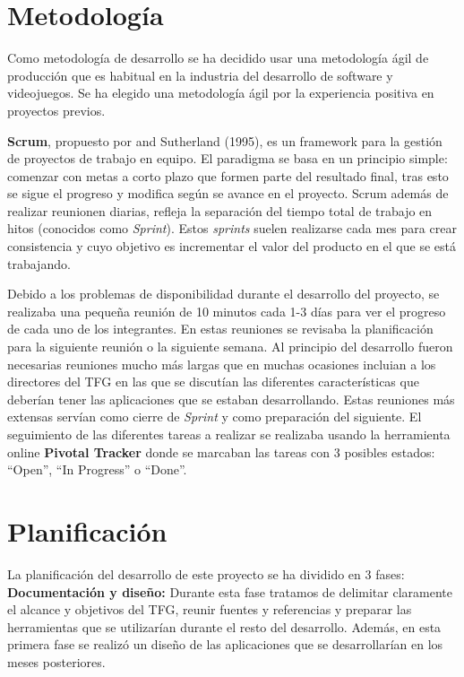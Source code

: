 \section{Metodolog\'ia}

Como metodolog\'ia de desarrollo se ha decidido usar una metodolog\'ia \'agil de producci\'on que es habitual en la industria del desarrollo de software y videojuegos. Se ha elegido una metodolog\'ia \'agil por la experiencia positiva en proyectos previos.

\textbf{Scrum}, propuesto por \cite{scrum} and Sutherland (1995), es un framework para la gesti\'on de proyectos de trabajo en equipo. El paradigma se basa en un principio simple: comenzar con metas a corto plazo que formen parte del resultado final, tras esto se sigue el progreso y modifica seg\'un se avance en el proyecto. Scrum adem\'as de realizar reunionen diarias, refleja la separaci\'on del tiempo total de trabajo en hitos (conocidos como \textit{Sprint}). Estos \textit{sprints} suelen realizarse cada mes para crear consistencia y cuyo objetivo es incrementar el valor del producto en el que se est\'a trabajando.

Debido a los problemas de disponibilidad durante el desarrollo del proyecto, se realizaba una peque\~na reuni\'on de 10 minutos cada 1-3 d\'ias para ver el progreso de cada uno de los integrantes. En estas reuniones se revisaba la planificaci\'on para la siguiente reuni\'on o la siguiente semana. Al principio del desarrollo fueron necesarias reuniones mucho m\'as largas que en muchas ocasiones incluian a los directores del TFG en las que se discut\'ian las diferentes caracter\'isticas que deber\'ian tener las aplicaciones que se estaban desarrollando. Estas reuniones m\'as extensas serv\'ian como cierre de \textit{Sprint} y como preparaci\'on del siguiente. El seguimiento de las diferentes tareas a realizar se realizaba usando la herramienta online \textbf{Pivotal Tracker} donde se marcaban las tareas con 3 posibles estados: ``Open'', ``In Progress'' o ``Done''.


\section{Planificaci\'on}

La planificaci\'on del desarrollo de este proyecto se ha dividido en 3 fases:\\


\textbf{Documentaci\'on y dise\~no:} Durante esta fase tratamos de delimitar claramente el alcance y objetivos del TFG, reunir fuentes y referencias y preparar las herramientas que se utilizar\'ian durante el resto del desarrollo. Adem\'as, en esta primera fase se realiz\'o un dise\~no de las aplicaciones que se desarrollar\'ian en los meses posteriores.\\

